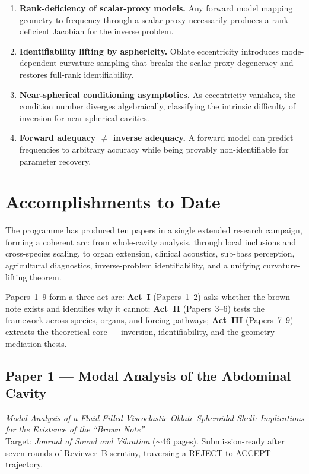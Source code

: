 \documentclass[11pt,a4paper]{article}
\begin{document}
\begin{enumerate}[leftmargin=*]
  \item \textbf{Rank-deficiency of scalar-proxy models.} Any forward model mapping geometry to frequency through a scalar proxy necessarily produces a rank-deficient Jacobian for the inverse problem.
  \item \textbf{Identifiability lifting by asphericity.} Oblate eccentricity introduces mode-dependent curvature sampling that breaks the scalar-proxy degeneracy and restores full-rank identifiability.
  \item \textbf{Near-spherical conditioning asymptotics.} As eccentricity vanishes, the condition number diverges algebraically, classifying the intrinsic difficulty of inversion for near-spherical cavities.
  \item \textbf{Forward adequacy $\neq$ inverse adequacy.} A forward model can predict frequencies to arbitrary accuracy while being provably non-identifiable for parameter recovery.
\end{enumerate}

\section{Accomplishments to Date}

The programme has produced ten papers in a single extended research campaign, forming a coherent arc: from whole-cavity analysis, through local inclusions and cross-species scaling, to organ extension, clinical acoustics, sub-bass perception, agricultural diagnostics, inverse-problem identifiability, and a unifying curvature-lifting theorem.

Papers~1--9 form a three-act arc: \textbf{Act~I} (Papers~1--2) asks whether the brown note exists and identifies why it cannot; \textbf{Act~II} (Papers~3--6) tests the framework across species, organs, and forcing pathways; \textbf{Act~III} (Papers~7--9) extracts the theoretical core --- inversion, identifiability, and the geometry-mediation thesis.

\subsection{Paper 1 --- Modal Analysis of the Abdominal Cavity}

\emph{Modal Analysis of a Fluid-Filled Viscoelastic Oblate Spheroidal Shell: Implications for the Existence of the ``Brown Note''}\\
Target: \emph{Journal of Sound and Vibration} ($\sim$46 pages). Submission-ready after seven rounds of Reviewer~B scrutiny, traversing a REJECT-to-ACCEPT trajectory.
\end{document}
